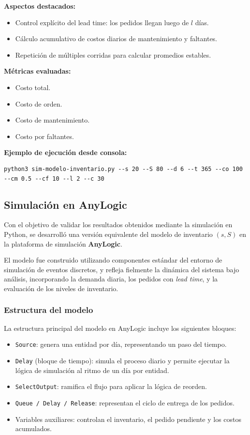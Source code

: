 \documentclass[12pt]{article}
\begin{document}
\textbf{Aspectos destacados:}
\begin{itemize}
    \item Control explícito del lead time: los pedidos llegan luego de $l$ días.
    \item Cálculo acumulativo de costos diarios de mantenimiento y faltantes.
    \item Repetición de múltiples corridas para calcular promedios estables.
\end{itemize}

\textbf{Métricas evaluadas:}
\begin{itemize}
    \item Costo total.
    \item Costo de orden.
    \item Costo de mantenimiento.
    \item Costo por faltantes.
\end{itemize}

\textbf{Ejemplo de ejecución desde consola:}
\begin{verbatim}
python3 sim-modelo-inventario.py --s 20 --S 80 --d 6 --t 365 --co 100 --cm 0.5 --cf 10 --l 2 --c 30
\end{verbatim}


\subsection{Simulación en AnyLogic}

Con el objetivo de validar los resultados obtenidos mediante la simulación en Python, se desarrolló una versión equivalente del modelo de inventario $(s, S)$ en la plataforma de simulación \textbf{AnyLogic}.

El modelo fue construido utilizando componentes estándar del entorno de simulación de eventos discretos, y refleja fielmente la dinámica del sistema bajo análisis, incorporando la demanda diaria, los pedidos con \textit{lead time}, y la evaluación de los niveles de inventario.

\subsubsection*{Estructura del modelo}

La estructura principal del modelo en AnyLogic incluye los siguientes bloques:

\begin{itemize}
    \item \texttt{Source}: genera una entidad por día, representando un paso del tiempo.
    \item \texttt{Delay} (bloque de tiempo): simula el proceso diario y permite ejecutar la lógica de simulación al ritmo de un día por entidad.
    \item \texttt{SelectOutput}: ramifica el flujo para aplicar la lógica de reorden.
    \item \texttt{Queue / Delay / Release}: representan el ciclo de entrega de los pedidos.
    \item Variables auxiliares: controlan el inventario, el pedido pendiente y los costos acumulados.
\end{itemize}
\end{document}
